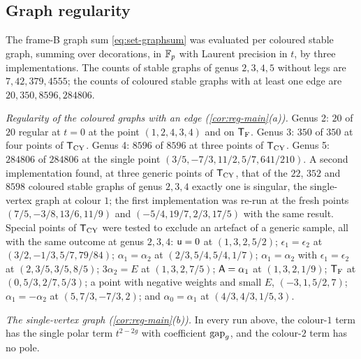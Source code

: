 \subsection{Graph regularity}
\label{sec:evi-graphs}

The frame-B graph sum \eqref{eq:set-graphsum} was evaluated per coloured stable graph, summing over decorations, in $\mathbb{F}_p$ with Laurent precision in $t$, by three implementations. The counts of stable graphs of genus $2,3,4,5$ without legs are $7,42,379,4555$; the counts of coloured stable graphs with at least one edge are $20,350,8596,284806$.

\emph{Regularity of the coloured graphs with an edge (\cref{cor:reg-main}(a)).} Genus 2: $20$ of $20$ regular at $t=0$ at the point $(1,2,4,3,4)$ and on $\mathsf{T}_{\mathrm{F}}$. Genus 3: $350$ of $350$ at four points of $\mathsf{T}_{\mathrm{CY}}$. Genus 4: $8596$ of $8596$ at three points of $\mathsf{T}_{\mathrm{CY}}$. Genus 5: $284806$ of $284806$ at the single point $(3/5,-7/3,11/2,5/7,641/210)$. A second implementation found, at three generic points of $\mathsf{T}_{\mathrm{CY}}$, that of the $22$, $352$ and $8598$ coloured stable graphs of genus $2,3,4$ exactly one is singular, the single-vertex graph at colour $1$; the first implementation was re-run at the fresh points $(7/5,-3/8,13/6,11/9)$ and $(-5/4,19/7,2/3,17/5)$ with the same result. Special points of $\mathsf{T}_{\mathrm{CY}}$ were tested to exclude an artefact of a generic sample, all with the same outcome at genus $2,3,4$: $\mathsf{u}=0$ at $(1,3,2,5/2)$; $\epsilon_1=\epsilon_2$ at $(3/2,-1/3,5/7,79/84)$; $\alpha_1=\alpha_2$ at $(2/3,5/4,5/4,1/7)$; $\alpha_1=\alpha_2$ with $\epsilon_1=\epsilon_2$ at $(2,3/5,3/5,8/5)$; $3\alpha_2=E$ at $(1,3,2,7/5)$; $\mathsf{A}=\alpha_1$ at $(1,3,2,1/9)$; $\mathsf{T}_{\mathrm{F}}$ at $(0,5/3,2/7,5/3)$; a point with negative weights and small $E$, $(-3,1,5/2,7)$; $\alpha_1=-\alpha_2$ at $(5,7/3,-7/3,2)$; and $\alpha_0=\alpha_1$ at $(4/3,4/3,1/5,3)$.

\emph{The single-vertex graph (\cref{cor:reg-main}(b)).} In every run above, the colour-$1$ term has the single polar term $t^{2-2g}$ with coefficient $\mathrm{gap}_g$, and the colour-$2$ term has no pole.

